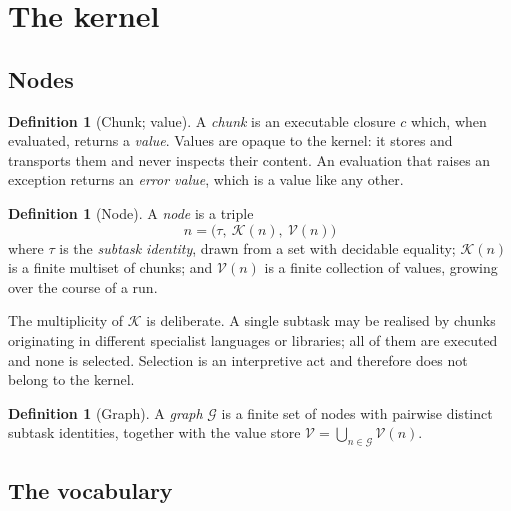 \documentclass[11pt,a4paper]{article}
\theoremstyle{thmstyle}
\theoremstyle{definition}
\newtheorem{definition}[theorem]{Definition}
\theoremstyle{remark}
\newcommand{\Node}{n}
\newcommand{\Chunks}{\mathcal{K}}
\newcommand{\Vals}{\mathcal{V}}
\newcommand{\Graph}{\mathcal{G}}
\begin{document}
\section{The kernel}
\label{sec:kernel}

\subsection{Nodes}

\begin{definition}[Chunk; value]
\label{def:chunk}
A \emph{chunk} is an executable closure $c$ which, when evaluated, returns a
\emph{value}. Values are opaque to the kernel: it stores and transports them
and never inspects their content. An evaluation that raises an exception
returns an \emph{error value}, which is a value like any other.
\end{definition}

\begin{definition}[Node]
\label{def:node}
A \emph{node} is a triple
\[
\Node=\bigl(\tau,\ \Chunks(\Node),\ \Vals(\Node)\bigr)
\]
where $\tau$ is the \emph{subtask identity}, drawn from a set with decidable
equality; $\Chunks(\Node)$ is a finite multiset of chunks; and
$\Vals(\Node)$ is a finite collection of values, growing over the course of
a run.
\end{definition}

The multiplicity of $\Chunks$ is deliberate. A single subtask may be
realised by chunks originating in different specialist languages or
libraries; all of them are executed and none is selected. Selection is an
interpretive act and therefore does not belong to the kernel.

\begin{definition}[Graph]
\label{def:graph}
A \emph{graph} $\Graph$ is a finite set of nodes with pairwise distinct
subtask identities, together with the value store
$\Vals=\bigcup_{\Node\in\Graph}\Vals(\Node)$.
\end{definition}

\subsection{The vocabulary}
\end{document}
